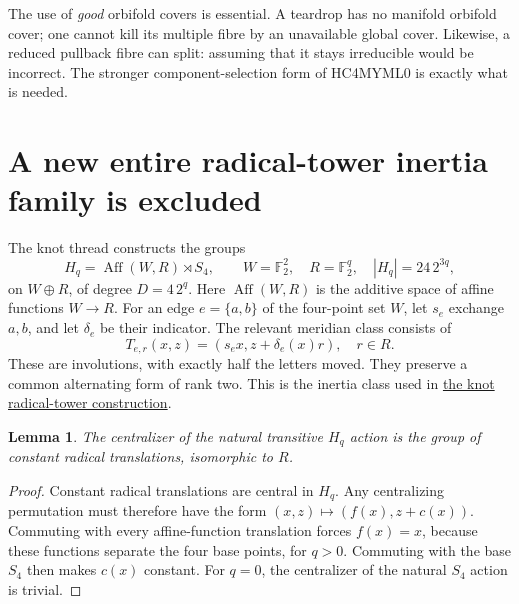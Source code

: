 \documentclass[11pt]{article}
\newtheorem{lemma}[theorem]{Lemma}
\newcommand{\F}{\mathbb F}
\newcommand{\Aff}{\operatorname{Aff}}
\begin{document}
The use of \emph{good} orbifold covers is essential. A teardrop has no
manifold orbifold cover; one cannot kill its multiple fibre by an
unavailable global cover. Likewise, a reduced pullback fibre can split:
assuming that it stays irreducible would be incorrect. The stronger
component-selection form of HC4MYML0 is exactly what is needed.

\section{A new entire radical-tower inertia family is excluded}

The knot thread constructs the groups
\[
 H_q=\Aff(W,R)\rtimes S_4,\qquad
 W=\F_2^2,\quad R=\F_2^q,
 \quad |H_q|=24\,2^{3q},                                  \tag{2}
\]
on $W\oplus R$, of degree $D=4\,2^q$.
Here $\Aff(W,R)$ is the additive space of affine functions $W\to R$.
For an edge $e=\{a,b\}$ of the four-point set $W$, let
$s_e$ exchange $a,b$, and let $\delta_e$ be their indicator.
The relevant meridian class consists of
\[
       T_{e,r}(x,z)=(s_ex,z+\delta_e(x)r),\quad r\in R.       \tag{3}
\]
These are involutions, with exactly half the letters moved. They preserve
a common alternating form of rank two. This is the inertia class used
in
\href{../meridional-rank/LIFT_DIMENSION_AND_RADICAL_TOWERS.tex}{the knot radical-tower construction}.

\begin{lemma}\label{lem:deck}
The centralizer of the natural transitive $H_q$ action is the group of
constant radical translations, isomorphic to $R$.
\end{lemma}
\begin{proof}
Constant radical translations are central in $H_q$. Any centralizing
permutation must therefore have the form
$(x,z)\mapsto(f(x),z+c(x))$.
Commuting with every affine-function translation forces $f(x)=x$,
because these functions separate the four base points, for $q>0$.
Commuting with the base $S_4$ then makes $c(x)$ constant.
For $q=0$, the centralizer of the natural $S_4$ action is trivial.
\end{proof}
\end{document}
